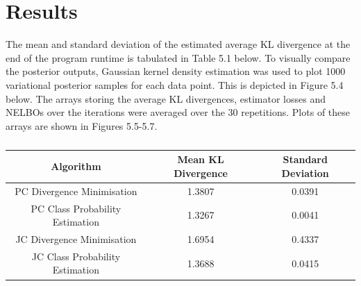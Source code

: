 \documentclass[honours,12pt]{unswthesis}
\newcommand{\E}{\mathbb{E}}
\numberwithin{equation}{section}
\theoremstyle{definition}
\begin{document}
\section{Results}
The mean and standard deviation of the estimated average KL divergence %
at the end of the program runtime is tabulated in Table 5.1 below. To visually compare the posterior outputs, Gaussian kernel density estimation was used to plot 1000 variational posterior samples for each data point. This is depicted in Figure 5.4 below. The arrays storing the average KL divergences, estimator losses and NELBOs over the iterations were averaged over the 30 repetitions. Plots of these arrays are shown in Figures 5.5-5.7.
\begin{table}[h!]
\begin{tabular}{|c|c|c|}
\hline
Algorithm & Mean KL Divergence & Standard Deviation\\
\hline
PC Divergence Minimisation & 1.3807 & 0.0391\\
\hline
PC Class Probability Estimation & 1.3267 & 0.0041\\
\hline
JC Divergence Minimisation & 1.6954 & 0.4337\\
\hline
JC Class Probability Estimation & 1.3688 & 0.0415\\
\hline
\end{tabular}
\caption{}
\end{table}
\end{document}
